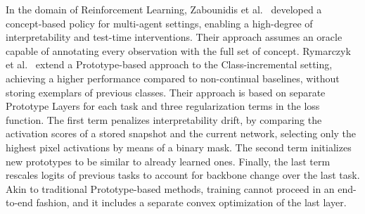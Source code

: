 %
In the domain of Reinforcement Learning, Zabounidis et al.~\cite{zabounidis2023concept} developed a concept-based policy for multi-agent settings, enabling a high-degree of interpretability and test-time interventions. Their approach assumes an oracle capable of annotating every observation with the full set of concept.%
Rymarczyk et al.~\cite{rymarczyk2023icicle} extend a Prototype-based approach to the Class-incremental setting, achieving a higher performance compared to non-continual baselines, without storing exemplars of previous classes.
Their approach is based on separate Prototype Layers for each task and three regularization terms in the loss function. The first term penalizes interpretability drift, by comparing the activation scores of a stored snapshot and the current network, selecting only the highest pixel activations by means of a binary mask. The second term initializes new prototypes to be similar to already learned ones. Finally, the last term rescales logits of previous tasks to account for backbone change over the last task. Akin to traditional Prototype-based methods, training cannot proceed in an end-to-end fashion, and it includes a separate convex optimization of the last layer.

